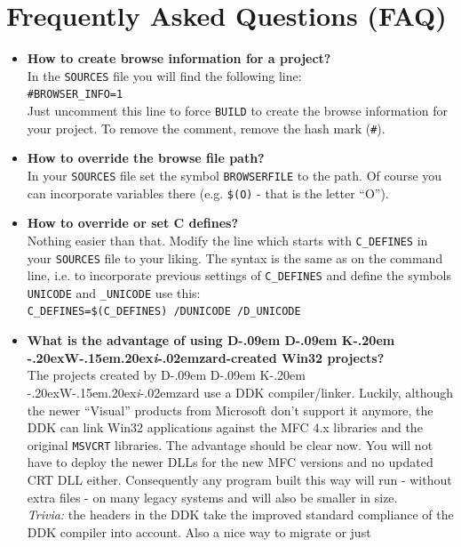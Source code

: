 \documentclass[a4paper,titlepage]{report}
\def\ddkwiz{D\kern-.09em D\kern-.09em K\kern-.20em \raise-.20ex\hbox{W}\kern-.15em\raise.20ex\hbox{\it{i}}\kern-.02em{zard}}
\begin{document}
\chapter{Frequently Asked Questions (FAQ)}\thispagestyle{fancy}
\label{cha:faq}
\begin{itemize}
  \item \textbf{How to create browse information for a project?}\\
        In the \texttt{SOURCES} file you will find the following line:\\
        \verb+#BROWSER_INFO=1+\\
        Just uncomment this line to force \texttt{BUILD} to create
        the browse information for your project. To remove the comment,
        remove the hash mark (\verb+#+).
  \item \textbf{How to override the browse file path?}\\
        In your \texttt{SOURCES} file set the symbol \texttt{BROWSERFILE} to
        the path. Of course you can incorporate variables there (e.g. \verb+$(O)+ - that is the letter ``O'').
  \item \textbf{How to override or set C defines?}\\
        Nothing easier than that. Modify the line which starts with \verb+C_DEFINES+
        in your \texttt{SOURCES} file to your liking. The syntax is the same as on the
        command line, i.e. to incorporate previous settings of \verb+C_DEFINES+
        and define the symbols \verb+UNICODE+ and \verb+_UNICODE+ use this:\\
        \verb+C_DEFINES=$(C_DEFINES) /DUNICODE /D_UNICODE+
  \item \textbf{What is the advantage of using \ddkwiz{}-created Win32 projects?}\\
        The projects created by \ddkwiz{} use a DDK compiler/linker. Luckily, although the
        newer ``Visual'' products from Microsoft don't support it anymore,
        the DDK can link Win32 applications against the MFC 4.x libraries
        and the original \texttt{MSVCRT} libraries. The advantage should be
        clear now. You will not have to deploy the newer DLLs for the new
        MFC versions and no updated CRT DLL either. Consequently any program
        built this way will run - without extra files - on many legacy systems
        and will also be smaller in size.\\
        \emph{Trivia:} the headers in the DDK take the improved standard compliance
        of the DDK compiler into account. Also a nice way to migrate or just

\end{itemize}
\end{document}
